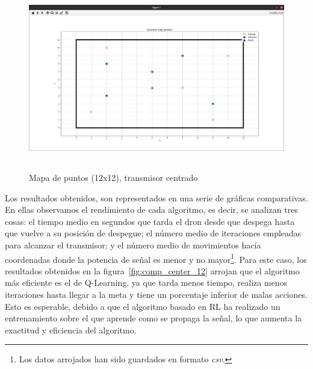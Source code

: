 \begin{figure} [t]
    \begin{center}
    \includegraphics[height=8cm]{imagenes/cap4/17_mapa_p_centro_12.png}
    \end{center}
    \caption[Mapa de puntos (12x12), transmisor centrado]{Mapa de puntos (12x12), transmisor centrado}
    \label{fig:map_p_center_12}
\end{figure}

Los resultados obtenidos, son representados en una serie de gráficas comparativas. En ellas observamos el rendimiento de cada algoritmo, es decir, se analizan tres cosas: el tiempo medio en segundos que tarda el dron desde que despega hasta que vuelve a su posición de despegue; el número medio de iteraciones empleadas para alcanzar el transmisor; y el número medio de movimientos hacía coordenadas donde la potencia de señal es menor y no mayor\footnote[4]{Los datos arrojados han sido guardados en formato \emph{csv}.}.  Para este caso, los resultados obtenidos en la figura~\ref{fig:comp_center_12} arrojan que el algoritmo más eficiente es el de Q-Learning, ya que tarda menos tiempo, realiza menos iteraciones hasta llegar a la meta y tiene un porcentaje inferior de malas acciones. Esto es esperable, debido a que el algoritmo basado en \ac{RL} ha realizado un entrenamiento sobre el que aprende como se propaga la señal, lo que aumenta la exactitud y eficiencia del algoritmo.\\

